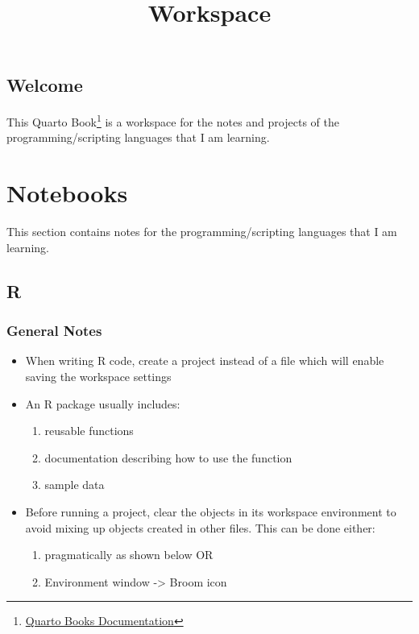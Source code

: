 \documentclass[
  letterpaper,
  DIV=11,
  numbers=noendperiod]{scrreprt}
\title{Workspace}
\author{}
\date{}
\providecommand{\tightlist}{%
  \setlength{\itemsep}{0pt}\setlength{\parskip}{0pt}}\usepackage{longtable,booktabs,array}
\renewcommand*\contentsname{Table of contents}
\newcommand\contentsname{Table of contents}
\begin{document}
\maketitle

\renewcommand*\contentsname{Table of contents}
{
\hypersetup{linkcolor=}
\setcounter{tocdepth}{2}
\tableofcontents
}

\chapter*{Welcome}\label{welcome}


This Quarto Book\footnote{\href{https://quarto.org/docs/books/}{Quarto
  Books Documentation}} is a workspace for the notes and projects of the
programming/scripting languages that I am learning.

\part{Notebooks}

This section contains notes for the programming/scripting languages that
I am learning.

\chapter{R}\label{r}

\section{General Notes}\label{general-notes}

\begin{itemize}
\tightlist
\item
  When writing R code, create a project instead of a file which will
  enable saving the workspace settings
\item
  An R package usually includes:

  \begin{enumerate}
  \def\labelenumi{\alph{enumi}.}
  \tightlist
  \item
    reusable functions
  \item
    documentation describing how to use the function
  \item
    sample data
  \end{enumerate}
\item
  Before running a project, clear the objects in its workspace
  environment to avoid mixing up objects created in other files. This
  can be done either:

  \begin{enumerate}
  \def\labelenumi{\alph{enumi}.}
  \tightlist
  \item
    pragmatically as shown below OR
  \item
    Environment window -\textgreater{} Broom icon
  \end{enumerate}
\end{itemize}
\end{document}
